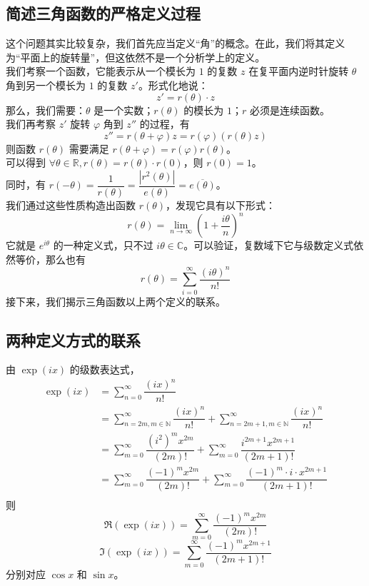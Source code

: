 \documentclass[UTF8,12pt]{ctexart}
\begin{document}
    \subsection{简述三角函数的严格定义过程}
        这个问题其实比较复杂，我们首先应当定义“角”的概念。在此，我们将其定义为“平面上的旋转量”，但这依然不是一个分析学上的定义。\\
        我们考察一个函数，它能表示从一个模长为 $1$ 的复数 $z$ 在复平面内逆时针旋转 $\theta$ 角到另一个模长为 $1$ 的复数 $z'$。形式化地说：
        $$
        z' = r(\theta)\cdot z
        $$
        那么，我们需要：$\theta$ 是一个实数；$r(\theta)$ 的模长为 $1$；$r$ 必须是连续函数。\\
        我们再考察 $z'$ 旋转 $\varphi$ 角到 $z''$ 的过程，有
        $$
        z'' = r(\theta + \varphi)z = r(\varphi)(r(\theta)z)
        $$
        则函数 $r(\theta)$ 需要满足 $r(\theta + \varphi) = r(\varphi)r(\theta)$。\\
        可以得到 $\forall \theta \in \mathbb R, r(\theta) = r(\theta)\cdot r(0)$，则 $r(0) = 1$。\\
        同时，有 $r(-\theta) = \dfrac{1}{r(\theta)} = \dfrac{\left|r^2(\theta)\right|}{e(\theta)} = \overline{e(\theta)}$。\\
        我们通过这些性质构造出函数 $r(\theta)$，发现它具有以下形式：
        $$
        r(\theta) = \lim_{n \to \infty}(1 + \dfrac{i\theta}{n})^n
        $$
        它就是 $e^{i\theta}$ 的一种定义式，只不过 $i\theta \in \mathbb C$。可以验证，复数域下它与级数定义式依然等价，那么也有
        $$
        r(\theta) = \sum_{i = 0}^{\infty}\dfrac{(i\theta)^n}{n!}
        $$
        接下来，我们揭示三角函数以上两个定义的联系。

    \subsection{两种定义方式的联系}
        由 $\exp(ix)$ 的级数表达式，$$
        \begin{aligned}
        \exp(ix) &= \sum_{n = 0}^{\infty}\dfrac{(ix)^n}{n!}\\
        &= \sum_{n = 2m, m \in \mathbb N}^{\infty} \dfrac{(ix)^n}{n!} + \sum_{n = 2m + 1, m \in \mathbb N}^{\infty} \dfrac{(ix)^n}{n!}\\
        &= \sum_{m = 0}^{\infty}\dfrac{(i^2)^m x^{2m}}{(2m)!} + \sum_{m = 0}^{\infty}\dfrac{i^{2m + 1} x^{2m + 1}}{(2m + 1)!}\\
        &= \sum_{m = 0}^{\infty}\dfrac{(-1)^m x^{2m}}{(2m)!} + \sum_{m = 0}^{\infty}\dfrac{(-1)^m\cdot i\cdot x^{2m + 1}}{(2m + 1)!}\\
        \end{aligned}
        $$
        则 $$
        \Re(\exp(ix)) = \sum_{m = 0}^{\infty}\dfrac{(-1)^m x^{2m}}{(2m)!}
        $$
        $$
        \Im(\exp(ix)) = \sum_{m = 0}^{\infty}\dfrac{(-1)^m x^{2m + 1}}{(2m + 1)!}
        $$
        分别对应 $\cos x$ 和 $\sin x$。
\end{document}
